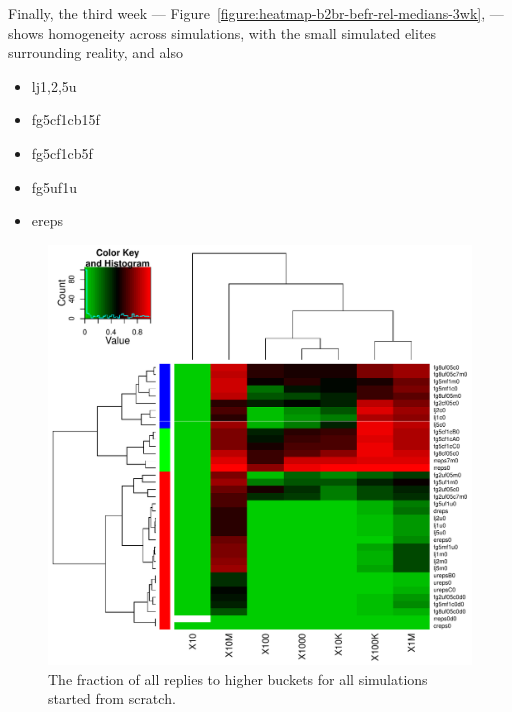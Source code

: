 \documentclass[10pt,oneside]{memoir}
\begin{document}
\begin{Spacing}{2}
Finally, the third week --- Figure~\ref{figure:heatmap-b2br-befr-rel-medians-3wk}, ---  shows homogeneity across simulations, with the small simulated elites surrounding reality, and also


\begin{itemize}


\item lj{1,2,5}u

\item fg5cf1cb15f

\item fg5cf1cb5f

\item fg5uf1u

\item ereps
\end{itemize}


\begin{figure}
\begin{center}
    \includegraphics{figures/crop/heatmap-b2br-befr-rel-medians-0wk}
    \caption{The fraction of all replies to higher buckets for all simulations started from scratch.}
    \label{figure:heatmap-b2br-befr-rel-medians-0wk}
\end{center}
\end{figure}


\end{Spacing}
\end{document}
